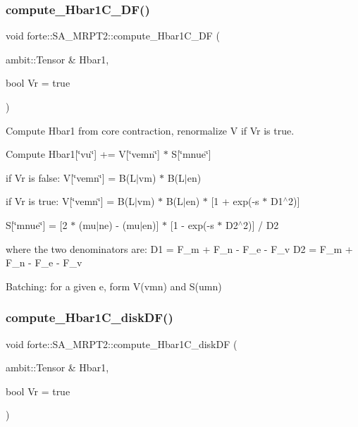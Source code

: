\subsubsection{\texorpdfstring{compute\+\_\+\+Hbar1\+C\+\_\+\+D\+F()}{compute\_Hbar1C\_DF()}}
{\footnotesize\ttfamily void forte\+::\+S\+A\+\_\+\+M\+R\+P\+T2\+::compute\+\_\+\+Hbar1\+C\+\_\+\+DF (\begin{DoxyParamCaption}\item[{ambit\+::\+Tensor \&}]{Hbar1,  }\item[{bool}]{Vr = {\ttfamily true} }\end{DoxyParamCaption})\hspace{0.3cm}{\ttfamily [protected]}}



Compute Hbar1 from core contraction, renormalize V if Vr is true. 

Compute Hbar1\mbox{[}\char`\"{}vu\char`\"{}\mbox{]} += V\mbox{[}\char`\"{}vemn\char`\"{}\mbox{]} $\ast$ S\mbox{[}\char`\"{}mnue\char`\"{}\mbox{]}


\begin{DoxyItemize}
\item if Vr is false\+: V\mbox{[}\char`\"{}vemn\char`\"{}\mbox{]} = B(L$\vert$vm) $\ast$ B(L$\vert$en)
\item if Vr is true\+: V\mbox{[}\char`\"{}vemn\char`\"{}\mbox{]} = B(L$\vert$vm) $\ast$ B(L$\vert$en) $\ast$ \mbox{[}1 + exp(-\/s $\ast$ D1$^\wedge$2)\mbox{]}
\item S\mbox{[}\char`\"{}mnue\char`\"{}\mbox{]} = \mbox{[}2 $\ast$ (mu$\vert$ne) -\/ (mu$\vert$en)\mbox{]} $\ast$ \mbox{[}1 -\/ exp(-\/s $\ast$ D2$^\wedge$2)\mbox{]} / D2
\end{DoxyItemize}

where the two denominators are\+: D1 = F\+\_\+m + F\+\_\+n -\/ F\+\_\+e -\/ F\+\_\+v D2 = F\+\_\+m + F\+\_\+n -\/ F\+\_\+e -\/ F\+\_\+v

Batching\+: for a given e, form V(vmn) and S(umn)\mbox{\label{classforte_1_1_s_a___m_r_p_t2_aa47effe7dce7d3101785027d4f2f7b9e}} 
\subsubsection{\texorpdfstring{compute\+\_\+\+Hbar1\+C\+\_\+disk\+D\+F()}{compute\_Hbar1C\_diskDF()}}
{\footnotesize\ttfamily void forte\+::\+S\+A\+\_\+\+M\+R\+P\+T2\+::compute\+\_\+\+Hbar1\+C\+\_\+disk\+DF (\begin{DoxyParamCaption}\item[{ambit\+::\+Tensor \&}]{Hbar1,  }\item[{bool}]{Vr = {\ttfamily true} }\end{DoxyParamCaption})\hspace{0.3cm}{\ttfamily [protected]}}



